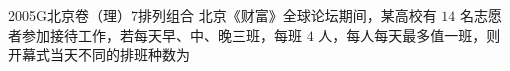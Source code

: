 
\begin{problem}{2005}{G}{北京卷（理）}{7}{排列组合}
北京《财富》全球论坛期间，某高校有 $ 14 $ 名志愿者参加接待工作，若每天早、中、晚三班，每班 $ 4 $ 人，每人每天最多值一班，则开幕式当天不同的排班种数为
\begin{choices}
\end{choices}
\end{problem}

\begin{answer}

\end{answer}

\begin{solutions}

\end{solutions}